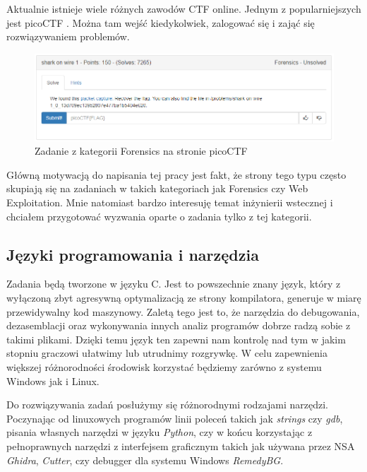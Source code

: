 \documentclass[polish,12pt]{aghthesis}
\begin{document}
Aktualnie istnieje wiele różnych zawodów CTF online.
Jednym z popularniejszych jest \newline picoCTF \cite{picoCTF}.
Można tam wejść kiedykolwiek, zalogować się i zająć się rozwiązywaniem problemów.

\begin{figure}[ht]
    \centering
    \includegraphics[width=15cm]{picoctf}
    \caption{Zadanie z kategorii Forensics na stronie picoCTF}
    \label{fig:picoctf}
\end{figure}

Główną motywacją do napisania tej pracy jest fakt, że strony tego typu często skupiają
się na zadaniach w takich kategoriach jak Forensics czy Web Exploitation.
Mnie natomiast bardzo interesuję temat inżynierii wstecznej i chciałem
przygotować wyzwania oparte o zadania tylko z tej kategorii.

\subsection{Języki programowania i narzędzia}

Zadania będą tworzone w języku C. Jest to powszechnie znany język, który
z wyłączoną zbyt agresywną optymalizacją ze strony kompilatora, generuje
w miarę przewidywalny kod maszynowy. Zaletą tego jest to, że narzędzia
do debugowania, dezasemblacji oraz wykonywania innych analiz programów
dobrze radzą sobie z takimi plikami. Dzięki temu język ten
zapewni nam kontrolę nad tym w jakim stopniu graczowi ułatwimy
lub utrudnimy rozgrywkę. W celu zapewnienia większej różnorodności
środowisk korzystać będziemy zarówno z systemu Windows jak i Linux.

Do rozwiązywania zadań posłużymy się różnorodnymi rodzajami narzędzi.
Poczynając od linuxowych programów linii poleceń takich jak \emph{strings}
czy \emph{gdb}, pisania własnych narzędzi w języku \emph{Python},
czy w końcu korzystając z pełnoprawnych narzędzi z interfejsem graficznym takich
jak używana przez NSA \emph{Ghidra}, \emph{Cutter}, czy debugger dla systemu
Windows \emph{RemedyBG}.

\clearpage
\end{document}
